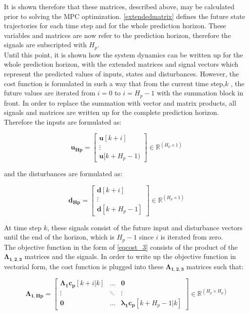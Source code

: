 It is shown therefore that these matrices, described above, may be calculated prior to solving the MPC optimization. \eqref{extendedmatrix} defines the future state trajectories for each time step and for the whole prediction horizon. These variables and matrices are now refer to the prediction horizon, therefore the signals are subscripted with $H_p$. 
\\
Until this point, it is shown how the system dynamics can be written up for the whole prediction horizon, with the extended matrices and signal vectors which represent the predicted values of inputs, states and disturbances. However, the cost function is formulated in such a way that from the current time step,$k$ , the future values are iterated from $i = 0$ to $i = H_p - 1$ with the summation block in front. In order to replace the summation with vector and matrix products, all signals and matrices are written up for the complete prediction horizon. Therefore the inputs are formulated as:

\begin{equation}
\bm{u_{Hp}} =  
 \begin{bmatrix}
  \bm{u}[k+i]\\
  \vdots  \\
  \bm{u}[k+H_p-1)   
 \end{bmatrix}
 \in \pmb{\mathbb{R}}^{(H_p \times 1)}
\end{equation}

and the disturbances are formulated as:

\begin{equation}
\bm{d_{Hp}} =  
 \begin{bmatrix}
  \bm{d}[k+i]\\
  \vdots  \\
  \bm{d}[k+H_p-1]   
 \end{bmatrix}
 \in \pmb{\mathbb{R}}^{(H_p \times 1)}
\end{equation}

At time step $k$, these signals consist of the future input and disturbance vectors until the end of the horizon, which is $H_p - 1$ since $i$ is iterated from zero. 
\\
The objective function in the form of \eqref{eqcost_3} consists of the product of the$ \bm{\Lambda_{1,2,3}}$ matrices and the signals. In order to write up the objective function in vectorial form, the cost function is plugged into these $\bm{\Lambda_{1,2,3}}$ matrices such that:

\begin{equation}
\bm{\Lambda_{1,Hp}} =
 \begin{bmatrix}
 \bm{\Lambda_1} \bm{c_p}[k+i|k] & \hdots & \bm{0} \\
 \vdots & \ddots & \vdots\\
 \bm{0} & \hdots & \bm{\lambda_1 c_p}[k+H_p-1|k] 
 \end{bmatrix}
 \in \pmb{\mathbb{R}}^{(H_p \times H_p)}
\end{equation} 


